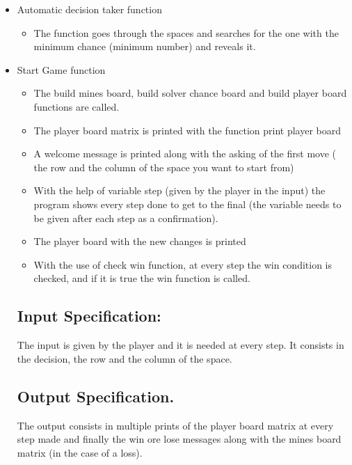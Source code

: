 \documentclass{article}
\begin{document}
\begin{itemize}
     \item Automatic decision taker function
        \begin{itemize}
        \item The function goes through the spaces and searches for the one with the minimum chance (minimum number) and reveals it.
        \end{itemize}
        
        
     \item Start Game function
        \begin{itemize} 
            \item The build mines board, build solver chance board and build player board functions are called.
            \item The player board matrix is printed with the function print player board
            \item A welcome message is printed along with the asking of the first move ( the row and the column of the space you want to start from) 
            \item With the help of  variable step (given by the player in the input) the program shows every step done to get to the final (the variable needs to be given after each step as a confirmation).
            \item The player board with the new changes is printed
            \item With the use of check win function, at every step the win condition is checked, and if it is true the win function is called.
        \end{itemize}
    


        
    
\subsection{Input Specification:}

The input is given by the player and it is needed at every step. It consists in the decision, the row and the column of the space.

\subsection{Output Specification.}

The output consists in multiple prints of the player board matrix at every step made and finally the win ore lose messages along with the mines board matrix (in the case of a loss).
    

\end{itemize}
\end{document}
